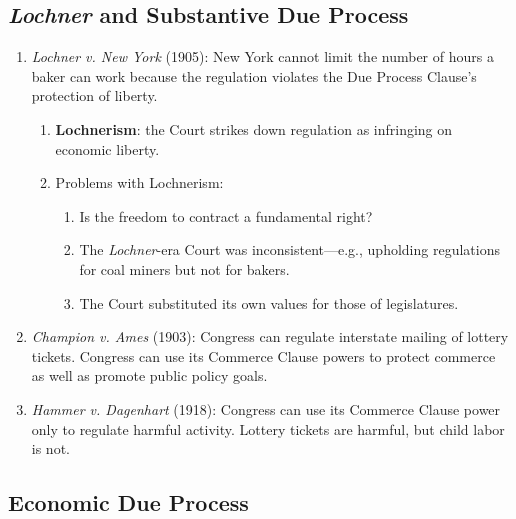 \subsection{\emph{Lochner} and Substantive Due Process}

\begin{enumerate}
    \item \emph{Lochner v. New York} (1905): New York cannot limit the number 
    of hours a baker can work because the regulation violates the Due Process 
    Clause's protection of liberty.
    \begin{enumerate}
        \item \textbf{Lochnerism}: the Court strikes down regulation as 
        infringing on economic liberty.
        \item Problems with Lochnerism:
        \begin{enumerate}
            \item Is the freedom to contract a fundamental right?
            \item The \emph{Lochner}-era Court was inconsistent---e.g., 
            upholding regulations for coal miners but not for bakers.
            \item The Court substituted its own values for those of 
            legislatures.
        \end{enumerate}
    \end{enumerate}
    \item \emph{Champion v. Ames} (1903): Congress can regulate interstate 
    mailing of lottery tickets. Congress can use its Commerce Clause powers to 
    protect commerce as well as promote public policy goals.
    \item \emph{Hammer v. Dagenhart} (1918): Congress can use its Commerce 
    Clause power only to regulate harmful activity. Lottery tickets are 
    harmful, but child labor is not.
\end{enumerate}

\subsection{Economic Due Process}

